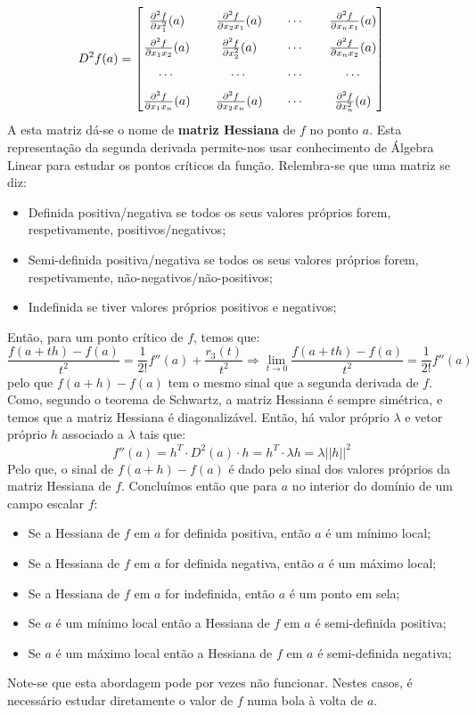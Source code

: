 \documentclass{article}
\begin{document}
$$
D^2 f(a) = 
\renewcommand*{\arraystretch}{1.8}
\begin{bmatrix}
\frac{\partial ^2 f}{\partial x_1 ^2} (a) && \frac{\partial ^2 f}{\partial x_2 x_1} (a) && \cdots && \frac{\partial ^2 f}{\partial x_n x_1} (a) \\
\frac{\partial ^2 f}{\partial x_1 x_2} (a) && \frac{\partial ^2 f}{\partial x_2^2} (a) && \cdots && \frac{\partial ^2 f}{\partial x_n x_2} (a) \\
\cdots && \cdots && \cdots && \cdots \\
\frac{\partial ^2 f}{\partial x_1 x_n} (a) && \frac{\partial ^2 f}{\partial x_2 x_n} (a) && \cdots && \frac{\partial ^2 f}{\partial x_n ^2} (a)
\end{bmatrix}
$$
A esta matriz dá-se o nome de \textbf{matriz Hessiana} de $f$ no ponto $a$. Esta representação da segunda derivada permite-nos usar conhecimento de Álgebra Linear para estudar os pontos críticos da função. Relembra-se que uma matriz se diz:
\begin{itemize}
	\item Definida positiva/negativa se todos os seus valores próprios forem, respetivamente, positivos/negativos;
	\item Semi-definida positiva/negativa se todos os seus valores próprios forem, respetivamente, não-negativos/não-positivos;
	\item Indefinida se tiver valores próprios positivos e negativos;
\end{itemize}
Então, para um ponto crítico de $f$, temos que:
$$
\frac{f(a+th)-f(a)}{t^2} = \frac{1}{2!}f''(a) + \frac{r_3(t)}{t^2} \Rightarrow \lim_{t \to 0} \frac{f(a+th)-f(a)}{t^2} = \frac{1}{2!}f''(a)
$$
pelo que $f(a+h)-f(a)$ tem o mesmo sinal que a segunda derivada de $f$. Como, segundo o teorema de Schwartz, a matriz Hessiana é sempre simétrica, e temos que a matriz Hessiana é diagonalizável. Então, há valor próprio $\lambda$ e vetor próprio $h$ associado a $\lambda$ tais que:
$$
f''(a) = h^T \cdot D^2 (a) \cdot h = h^T \cdot \lambda h = \lambda ||h||^2
$$
Pelo que, o sinal de $f(a+h)-f(a)$ é dado pelo sinal dos valores próprios da matriz Hessiana de $f$. Concluímos então que para $a$ no interior do domínio de um campo escalar $f$:
\begin{itemize}
	\item Se a Hessiana de $f$ em $a$ for definida positiva, então $a$ é um mínimo local;
	\item Se a Hessiana de $f$ em $a$ for definida negativa, então $a$ é um máximo local;
	\item Se a Hessiana de $f$ em $a$ for indefinida, então $a$ é um ponto em sela;
	\item Se $a$ é um mínimo local então a Hessiana de $f$ em $a$ é semi-definida positiva;
	\item Se $a$ é um máximo local então a Hessiana de $f$ em $a$ é semi-definida negativa;
\end{itemize}
Note-se que esta abordagem pode por vezes não funcionar. Nestes casos, é necessário estudar diretamente o valor de $f$ numa bola à volta de $a$.
\end{document}
